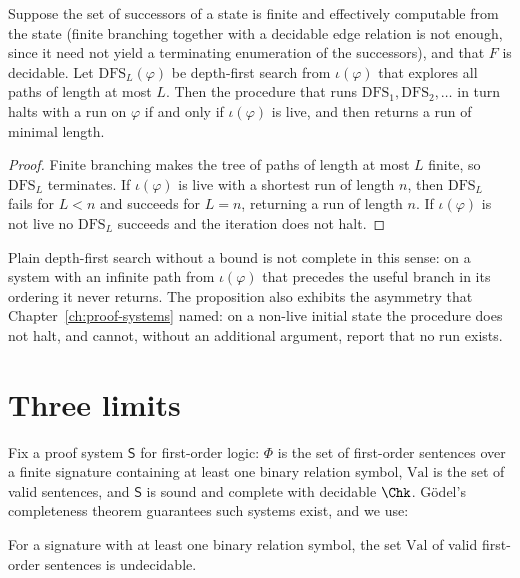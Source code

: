 \begin{proposition}
\label{prop:ids}
Suppose the set of successors of a state is finite and effectively computable from the state (finite branching together with a decidable edge relation is not enough, since it need not yield a terminating enumeration of the successors), and that $F$ is decidable. Let $\mathrm{DFS}_L(\varphi)$ be depth-first search from $\iota(\varphi)$ that explores all paths of length at most $L$. Then the procedure that runs $\mathrm{DFS}_1,\mathrm{DFS}_2,\dots$ in turn halts with a run on $\varphi$ if and only if $\iota(\varphi)$ is live, and then returns a run of minimal length.
\end{proposition}

\begin{proof}
Finite branching makes the tree of paths of length at most $L$ finite, so $\mathrm{DFS}_L$ terminates. If $\iota(\varphi)$ is live with a shortest run of length $n$, then $\mathrm{DFS}_L$ fails for $L<n$ and succeeds for $L=n$, returning a run of length $n$. If $\iota(\varphi)$ is not live no $\mathrm{DFS}_L$ succeeds and the iteration does not halt.
\end{proof}

Plain depth-first search without a bound is not complete in this sense: on a system with an infinite path from $\iota(\varphi)$ that precedes the useful branch in its ordering it never returns. The proposition also exhibits the asymmetry that Chapter~\ref{ch:proof-systems} named: on a non-live initial state the procedure does not halt, and cannot, without an additional argument, report that no run exists.

\section{Three limits}
\label{sec:limits}

Fix a proof system $\mathsf{S}$ for first-order logic: $\Phi$ is the set of first-order sentences over a finite signature containing at least one binary relation symbol, $\mathrm{Val}$ is the set of valid sentences, and $\mathsf{S}$ is sound and complete with decidable $\Chk$. Gödel's completeness theorem guarantees such systems exist, and we use:

\begin{theorem}
\label{thm:church}
 For a signature with at least one binary relation symbol, the set $\mathrm{Val}$ of valid first-order sentences is undecidable.
\end{theorem}

